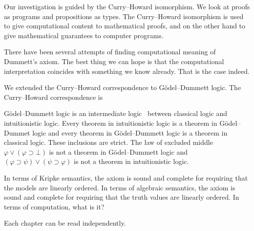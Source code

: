 
Our investigation is guided by the Curry--Howard isomorphism.
We look at proofs as programs and propositions as types.
The Curry--Howard isomorphism is used to give computational content
to mathematical proofs, and on the other hand to give mathematical
guarantees to computer programs.


There have been several attempts of finding computational meaning of
Dummett's axiom.  
The best thing we can hope is that the computational
interpretation coincides with something we know already.
That is the case indeed.

We extended the Curry--Howard correspondence to G\"odel--Dummett logic.
The Curry--Howard correspondence is 

G\"odel--Dummett logic is an intermediate logic~\citep{umezawa} between
classical logic and intuitionistic logic.  Every theorem in
intuitionistic logic is a theorem in G\"odel--Dummet logic and every
theorem in G\"odel--Dummett logic is a theorem in classical logic.
These inclusions are strict.  The law of excluded middle
$\varphi\vee(\varphi\supset \bot)$ is not a theorem in G\"odel--Dummett
logic and $(\varphi\supset\psi)\vee(\psi\supset\varphi)$ is not a
theorem in intuitionistic logic.

In terms of Kripke semantics, the axiom is sound and complete for
requiring that the models are linearly ordered.
In terms of algebraic semantics, the axiom is sound and complete for
requiring that the truth values are linearly ordered.
In terms of computation, what is it?

Each chapter can be read independently.

\subsection{}
\subsection{}

